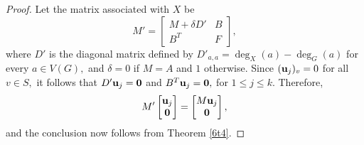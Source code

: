 \documentclass[12pt,a4paper]{article}
\def \u {{\bf u}}
\begin{document}
\begin{proof}
Let the matrix associated with $X$ be
    \[M'=\begin{bmatrix}
        M+\delta D' & B\\
        B^T & F
    \end{bmatrix},\] where $D'$ is the diagonal matrix defined by $D'_{a,a}=\operatorname{deg}_X(a)-\operatorname{deg}_G(a)$ for every $a\in V(G),$ and $\delta=0$ if $M=A$ and $1$ otherwise. Since $(\u_j)_v=0$ for all $v\in S,$ it follows that $D'\u_j=\mathbf{0}$ and $
B^T\u_j=\mathbf{0},$ for $1\leq j\leq k.$ Therefore, \[M'\begin{bmatrix}
\u_j\\
\mathbf{0}
\end{bmatrix}=
\begin{bmatrix}
M\u_j\\
\mathbf{0}
\end{bmatrix},\]
and the conclusion now follows from Theorem \ref{6t4}.
\end{proof}
\end{document}

